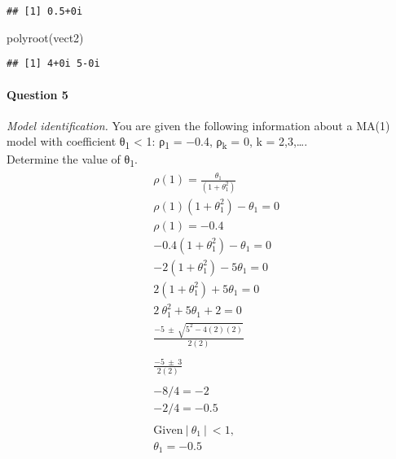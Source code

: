 \documentclass[
]{article}
\newenvironment{Shaded}{\begin{snugshade}}{\end{snugshade}}
\newcommand{\FunctionTok}[1]{\textcolor[rgb]{0.00,0.00,0.00}{#1}}
\newcommand{\NormalTok}[1]{#1}
\begin{document}
\begin{verbatim}
## [1] 0.5+0i
\end{verbatim}

\begin{Shaded}
\begin{Highlighting}[]
\FunctionTok{polyroot}\NormalTok{(vect2)}
\end{Highlighting}
\end{Shaded}

\begin{verbatim}
## [1] 4+0i 5-0i
\end{verbatim}

\hfill\break
\hfill\break

\hypertarget{question-5}{%
\paragraph{Question 5}\label{question-5}}

\emph{Model identification.} You are given the following information
about a MA(1) model with coefficient
\textbar θ\textsubscript{1}\textbar{} \textless{} 1: ρ\textsubscript{1}
= −0.4, ρ\textsubscript{k} = 0, k = 2,3,\ldots.\\
Determine the value of θ\textsubscript{1}.\\

\[
\begin{aligned}
& \rho(1) = \frac{\theta_{1}}{(1+\theta^2_{1})}\\
& \rho(1)(1+\theta^2_{1})-\theta_{1} = 0\\
& \rho(1) = -0.4\\
& -0.4(1+\theta^2_{1})-\theta_{1} = 0\\
& -2(1+\theta^2_{1}) - 5\theta_{1}=0\\
& 2(1+\theta^2_{1}) + 5\theta_{1}=0\\
& 2\ \theta^2_{1} + 5\theta_{1} + 2 = 0\\
& \frac{-5\ \pm\ \sqrt{5^2-4(2)(2)}}{2(2)} \\ \\
& \frac{-5\ \pm\ 3}{2(2)}\\ \\
& -8/4 = -2 \\
& -2/4 = -0.5
\\
\\
&\text{Given}\ |\ \theta_{1}\ |\ < 1,\\ 
&\theta_{1} = -0.5
\end{aligned}
\]

\hfill\break
\hfill\break
\end{document}

